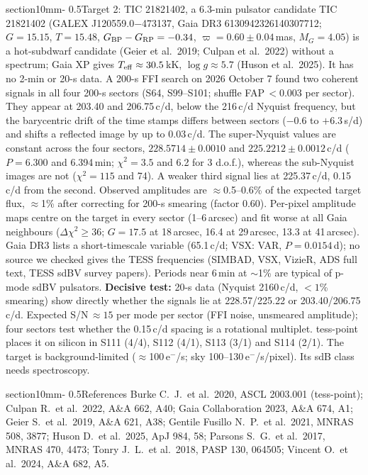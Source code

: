 \documentclass[letterpaper,11pt]{article}
\makeatletter
\renewcommand{\section}{\@startsection%
{section}{1}{0mm}{-\baselineskip}%
{0.5\baselineskip}{\normalfont\Large\bfseries}}%
\makeatother
\begin{document}
\section{Target 2: TIC 21821402, a 6.3-min pulsator candidate}
TIC 21821402 (GALEX J120559.0$-$473137, Gaia DR3 6130942326140307712; $G=15.15$, $T=15.48$, $G_{\rm BP}-G_{\rm RP}=-0.34$, $\varpi=0.60\pm0.04$\,mas, $M_G=4.05$) is a hot-subdwarf candidate (Geier et al.\ 2019; Culpan et al.\ 2022) without a spectrum; Gaia XP gives $T_{\rm eff}\approx30.5$\,kK, $\log g\approx5.7$ (Huson et al.\ 2025). It has no 2-min or 20-s data. A 200-s FFI search on 2026 October 7 found two coherent signals in all four 200-s sectors (S64, S99--S101; shuffle FAP\,$<0.003$ per sector). They appear at 203.40 and 206.75\,c/d, below the 216\,c/d Nyquist frequency, but the barycentric drift of the time stamps differs between sectors ($-0.6$ to $+6.3$\,s/d) and shifts a reflected image by up to 0.03\,c/d. The super-Nyquist values are constant across the four sectors, $228.5714\pm0.0010$ and $225.2212\pm0.0012$\,c/d ($P=6.300$ and 6.394\,min; $\chi^2=3.5$ and 6.2 for 3 d.o.f.), whereas the sub-Nyquist images are not ($\chi^2=115$ and 74). A weaker third signal lies at 225.37\,c/d, 0.15\,c/d from the second. Observed amplitudes are $\approx$0.5--0.6\% of the expected target flux, $\approx$1\% after correcting for 200-s smearing (factor 0.60). Per-pixel amplitude maps centre on the target in every sector (1--6\,arcsec) and fit worse at all Gaia neighbours ($\Delta\chi^2\ge36$; $G=17.5$ at 18\,arcsec, 16.4 at 29\,arcsec, 13.3 at 41\,arcsec). Gaia DR3 lists a short-timescale variable (65.1\,c/d; VSX: VAR, $P=0.0154$\,d); no source we checked gives the TESS frequencies (SIMBAD, VSX, VizieR, ADS full text, TESS sdBV survey papers). Periods near 6\,min at $\sim$1\% are typical of p-mode sdBV pulsators. \textbf{Decisive test:} 20-s data (Nyquist 2160\,c/d, $<1$\% smearing) show directly whether the signals lie at 228.57/225.22 or 203.40/206.75\,c/d. Expected S/N\,$\approx15$ per mode per sector (FFI noise, unsmeared amplitude); four sectors test whether the 0.15\,c/d spacing is a rotational multiplet. tess-point places it on silicon in S111 (4/4), S112 (4/1), S113 (3/1) and S114 (2/1). The target is background-limited ($\approx$100\,e$^-$/s; sky 100--130\,e$^-$/s/pixel). Its sdB class needs spectroscopy.

\section{References}
{\small Burke C.~J.\ et al.\ 2020, ASCL 2003.001 (tess-point); Culpan R.\ et al.\ 2022, A\&A 662, A40;
Gaia Collaboration 2023, A\&A 674, A1;
Geier S.\ et al.\ 2019, A\&A 621, A38; Gentile Fusillo N.~P.\ et al.\ 2021, MNRAS 508, 3877; Huson D.\ et al.\ 2025, ApJ 984, 58;
Parsons S.~G.\ et al.\ 2017, MNRAS 470, 4473;
Tonry J.~L.\ et al.\ 2018, PASP 130, 064505;
Vincent O.\ et al.\ 2024, A\&A 682, A5.}
\end{document}

